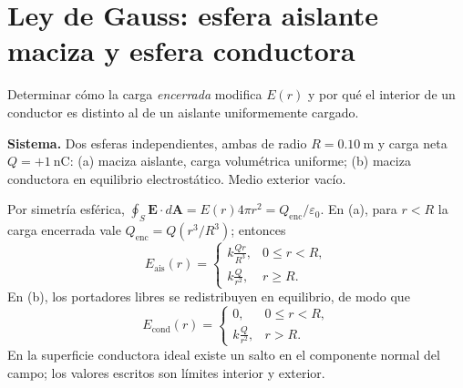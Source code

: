 \documentclass[11pt,a4paper]{article}
\newcommand{\ej}[2]{\clearpage\section{#2}}
\newcommand{\vect}[1]{\boldsymbol{#1}}
\begin{document}
\ej{4}{Ley de Gauss: esfera aislante maciza y esfera conductora}
\begin{objetivo}Determinar cómo la carga \emph{encerrada} modifica $E(r)$ y por qué el interior de un conductor es distinto al de un aislante uniformemente cargado.\end{objetivo}
\textbf{Sistema.} Dos esferas independientes, ambas de radio $R=\SI{0.10}{\metre}$ y carga neta $Q=+\SI{1}{\nano\coulomb}$: (a) maciza aislante, carga volumétrica uniforme; (b) maciza conductora en equilibrio electrostático. Medio exterior vacío.
\begin{center}\end{center}
\begin{metodo}
Por simetría esférica, $\oint_S\vect E\cdot d\vect A=E(r)4\pi r^2=Q_{\mathrm{enc}}/\varepsilon_0$. En (a), para $r<R$ la carga encerrada vale $Q_{\mathrm{enc}}=Q(r^3/R^3)$; entonces
\[\boxed{E_{\mathrm{ais}}(r)=\begin{cases}\displaystyle k\frac{Qr}{R^3},&0\le r<R,\\[2mm]\displaystyle k\frac Q{r^2},&r\ge R.\end{cases}}\]
En (b), los portadores libres se redistribuyen en equilibrio, de modo que
\[\boxed{E_{\mathrm{cond}}(r)=\begin{cases}0,&0\le r<R,\\[1mm]\displaystyle k\frac Q{r^2},&r>R.\end{cases}}\]
En la superficie conductora ideal existe un salto en el componente normal del campo; los valores escritos son límites interior y exterior.
\end{metodo}
\end{document}
